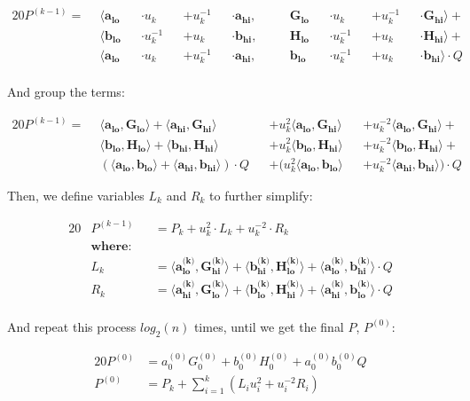 \documentclass{article}
\newcommand{\eq}[1]{\begin{alignat*}{20}#1\end{alignat*}}
\renewcommand{\vec}[1]{\boldsymbol{#1}}
\newcommand{\dotp}[2]{\langle #1, #2 \rangle}
\newcommand{\opn}[1]{\operatorname{#1}}
\newcommand{\veclo}[1]{\vec{#1_{\opn{lo}}}}
\newcommand{\vechi}[1]{\vec{#1_{\opn{hi}}}}
\begin{document}
\eq{
	P^{(k-1)} = \: \:
	&\dotp
		{        \veclo{a} &&\cdot u_k      &&+ u_k^{-1} &&\cdot \vechi{a}}
		{&&\quad \veclo{G} &&\cdot u_k      &&+ u_k^{-1} &&\cdot \vechi{G}}
	+ \\
	&\dotp
		{        \veclo{b} &&\cdot u_k^{-1} &&+ u_k      &&\cdot \vechi{b}}
		{&&\quad \veclo{H} &&\cdot u_k^{-1} &&+ u_k      &&\cdot \vechi{H}}
	+ \\
	&\dotp
		{        \veclo{a} &&\cdot u_k      &&+ u_k^{-1} &&\cdot \vechi{a}}
		{&&\quad \veclo{b} &&\cdot u_k^{-1} &&+ u_k      &&\cdot \vechi{b}}
	\cdot Q \\
}

And group the terms:

\eq{
	P^{(k-1)} = \: \:
	        &\dotp{\veclo{a}}{\veclo{G}}            +
	         \dotp{\vechi{a}}{\vechi{G}}          &&+
	u^2_k    \dotp{\veclo{a}}{\vechi{G}}          &&+
	u^{-2}_k \dotp{\veclo{a}}{\vechi{G}}            +\\
	        &\dotp{\veclo{b}}{\veclo{H}}            +
	         \dotp{\vechi{b}}{\vechi{H}}          &&+
	u^2_k    \dotp{\veclo{b}}{\vechi{H}}          &&+
	u^{-2}_k \dotp{\veclo{b}}{\vechi{H}}            +\\
	       &(\dotp{\veclo{a}}{\veclo{b}}            +
		       \dotp{\vechi{a}}{\vechi{b}}) \cdot Q &&+
	(u^2_k   \dotp{\veclo{a}}{\veclo{b}}          &&+
	u^{-2}_k \dotp{\vechi{a}}{\vechi{b}}) \cdot Q
}

Then, we define variables $L_k$ and $R_k$ to further simplify: 

\eq{
	&P^{(k-1)} &&= P_k + u^2_k \cdot L_k + u^{-2}_k \cdot R_k \\
	&\textbf{where:} \\
	&L_k     &&= \dotp{\veclo{a^{\text{(k)}}}}{\vechi{G^{\text{(k)}}}} +
	             \dotp{\vechi{b^{\text{(k)}}}}{\veclo{H^{\text{(k)}}}} + 
	             \dotp{\veclo{a^{\text{(k)}}}}{\vechi{b^{\text{(k)}}}} \cdot Q \\
	&R_k     &&= \dotp{\vechi{a^{\text{(k)}}}}{\veclo{G^{\text{(k)}}}} +
	             \dotp{\veclo{b^{\text{(k)}}}}{\vechi{H^{\text{(k)}}}} +
	             \dotp{\vechi{a^{\text{(k)}}}}{\veclo{b^{\text{(k)}}}} \cdot Q \\
}

And repeat this process $log_2(n)$ times, until we get the final $P$, $P^{(0)}$:

\eq{
	P^{(0)} &= a^{(0)}_0 G^{(0)}_0 + b^{(0)}_0 H^{(0)}_0 + a^{(0)}_0 b^{(0)}_0 Q \\
	P^{(0)} &= P_k + \sum^k_{i=1}(L_i u^2_i + u^{-2}_i R_i)
}
\end{document}
